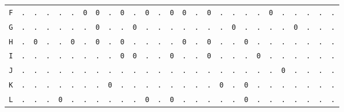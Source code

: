 \begin{figure}[H]
\begin{center}
{\begin{tabular}{c|cccccccccccccccccccccccccc}
				\texttt{F} & \texttt{.} & \texttt{.} & \texttt{.} & \texttt{.} & \texttt{.} & \texttt{0} & \texttt{0} & \texttt{.} & \texttt{0} & \texttt{.} & \texttt{0} & \texttt{.} & \texttt{0} & \texttt{0} & \texttt{.} & \texttt{0} & \texttt{.} & \texttt{.} & \texttt{.} & \texttt{.} & \texttt{0} & \texttt{.} & \texttt{.} & \texttt{.} & \texttt{.} & \texttt{.} \\
				\texttt{G} & \texttt{.} & \texttt{.} & \texttt{.} & \texttt{.} & \texttt{.} & \texttt{.} & \texttt{0} & \texttt{.} & \texttt{.} & \texttt{0} & \texttt{.} & \texttt{.} & \texttt{.} & \texttt{.} & \texttt{.} & \texttt{.} & \texttt{.} & \texttt{0} & \texttt{.} & \texttt{.} & \texttt{.} & \texttt{.} & \texttt{0} & \texttt{.} & \texttt{.} & \texttt{.} \\
				\texttt{H} & \texttt{.} & \texttt{0} & \texttt{.} & \texttt{.} & \texttt{0} & \texttt{.} & \texttt{0} & \texttt{.} & \texttt{0} & \texttt{.} & \texttt{.} & \texttt{.} & \texttt{.} & \texttt{0} & \texttt{.} & \texttt{0} & \texttt{.} & \texttt{.} & \texttt{0} & \texttt{.} & \texttt{.} & \texttt{.} & \texttt{.} & \texttt{.} & \texttt{.} & \texttt{.} \\
				\texttt{I} & \texttt{.} & \texttt{.} & \texttt{.} & \texttt{.} & \texttt{.} & \texttt{.} & \texttt{.} & \texttt{.} & \texttt{0} & \texttt{0} & \texttt{.} & \texttt{.} & \texttt{0} & \texttt{.} & \texttt{.} & \texttt{0} & \texttt{.} & \texttt{.} & \texttt{.} & \texttt{0} & \texttt{.} & \texttt{.} & \texttt{.} & \texttt{.} & \texttt{.} & \texttt{.} \\
				\texttt{J} & \texttt{.} & \texttt{.} & \texttt{.} & \texttt{.} & \texttt{.} & \texttt{.} & \texttt{.} & \texttt{.} & \texttt{.} & \texttt{.} & \texttt{.} & \texttt{.} & \texttt{.} & \texttt{.} & \texttt{.} & \texttt{.} & \texttt{.} & \texttt{.} & \texttt{.} & \texttt{.} & \texttt{.} & \texttt{0} & \texttt{.} & \texttt{.} & \texttt{.} & \texttt{.} \\
				\texttt{K} & \texttt{.} & \texttt{.} & \texttt{.} & \texttt{.} & \texttt{.} & \texttt{.} & \texttt{.} & \texttt{0} & \texttt{.} & \texttt{.} & \texttt{.} & \texttt{.} & \texttt{.} & \texttt{.} & \texttt{.} & \texttt{.} & \texttt{0} & \texttt{.} & \texttt{0} & \texttt{.} & \texttt{.} & \texttt{.} & \texttt{.} & \texttt{.} & \texttt{.} & \texttt{.} \\
				\texttt{L} & \texttt{.} & \texttt{.} & \texttt{.} & \texttt{0} & \texttt{.} & \texttt{.} & \texttt{.} & \texttt{.} & \texttt{.} & \texttt{.} & \texttt{0} & \texttt{.} & \texttt{0} & \texttt{.} & \texttt{.} & \texttt{.} & \texttt{.} & \texttt{.} & \texttt{0} & \texttt{.} & \texttt{.} & \texttt{.} & \texttt{.} & \texttt{.} & \texttt{.} & \texttt{.} \\

\end{tabular}}
\end{center}
\end{figure}
